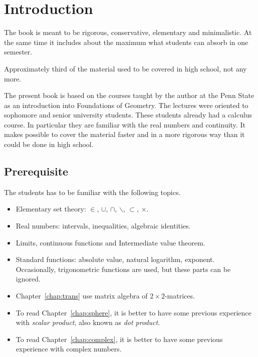 \chapter*{Introduction}

The book is meant to be 
rigorous, 
conservative, 
elementary and
minimalistic.
At the same time it includes about the maximum what students can absorb in one semester.

Approximately third of the material used to be covered in high school, not any more.

The present book is based 
on the courses taught by the author 
at the Penn State 
as an introduction into Foundations of Geometry.
The lectures were oriented to sophomore and senior university students.  
These students already had a calculus course.
In particular they are familiar with the real numbers and continuity.
It makes possible to cover the material faster 
and  in a more rigorous way
than it could be done in high school.



\section*{Prerequisite}

The students has to be familiar 
with the following topics.
\begin{itemize}
\item Elementary set theory: 
$\in$,
$\cup$, 
$\cap$,
$\backslash$,
$\subset$,
$\times$.
\item Real numbers: intervals, inequalities, algebraic identities.
\item Limits, continuous functions and  Intermediate value theorem.
\item Standard functions: 
absolute value, 
natural logarithm,
exponent. 
Occasionally, trigonometric functions  are used, 
but these parts can be ignored.
\item  Chapter~\ref{chap:trans} 
use matrix algebra of $2{\times}2$-matrices.
\item To read Chapter~\ref{chap:sphere}, it is better to have some previous experience with {}\emph{scalar product}, also known as {}\emph{dot product}.
\item To read Chapter~\ref{chap:complex}, it is better to have some previous experience with complex numbers.
\end{itemize} 

